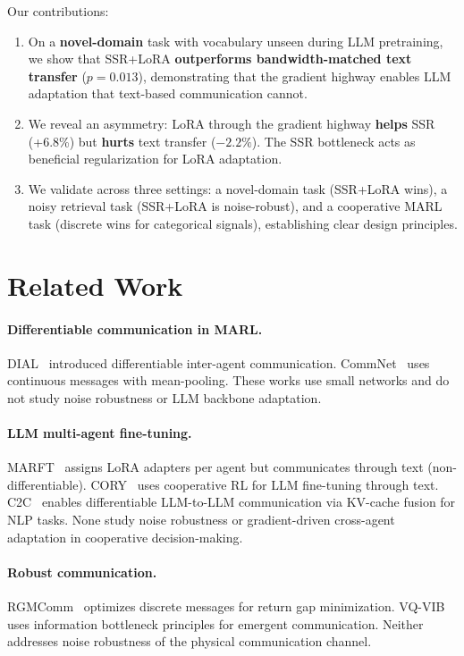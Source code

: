 \documentclass[11pt,a4paper]{article}
\begin{document}
Our contributions:
\begin{enumerate}[nosep]
    \item On a \textbf{novel-domain} task with vocabulary unseen during LLM pretraining, we show that SSR+LoRA \textbf{outperforms bandwidth-matched text transfer} ($p{=}0.013$), demonstrating that the gradient highway enables LLM adaptation that text-based communication cannot.
    \item We reveal an asymmetry: LoRA through the gradient highway \textbf{helps} SSR (+6.8\%) but \textbf{hurts} text transfer ($-2.2\%$). The SSR bottleneck acts as beneficial regularization for LoRA adaptation.
    \item We validate across three settings: a novel-domain task (SSR+LoRA wins), a noisy retrieval task (SSR+LoRA is noise-robust), and a cooperative MARL task (discrete wins for categorical signals), establishing clear design principles.
\end{enumerate}

\section{Related Work}

\paragraph{Differentiable communication in MARL.}
DIAL~\cite{foerster2016learning} introduced differentiable inter-agent communication. CommNet~\cite{sukhbaatar2016learning} uses continuous messages with mean-pooling. These works use small networks and do not study noise robustness or LLM backbone adaptation.

\paragraph{LLM multi-agent fine-tuning.}
MARFT~\cite{liao2025marft} assigns LoRA adapters per agent but communicates through text (non-differentiable). CORY~\cite{ma2024cory} uses cooperative RL for LLM fine-tuning through text. C2C~\cite{fan2026c2c} enables differentiable LLM-to-LLM communication via KV-cache fusion for NLP tasks. None study noise robustness or gradient-driven cross-agent adaptation in cooperative decision-making.

\paragraph{Robust communication.}
RGMComm~\cite{chen2024rgmcomm} optimizes discrete messages for return gap minimization. VQ-VIB~\cite{tucker2022towards} uses information bottleneck principles for emergent communication. Neither addresses noise robustness of the physical communication channel.
\end{document}
